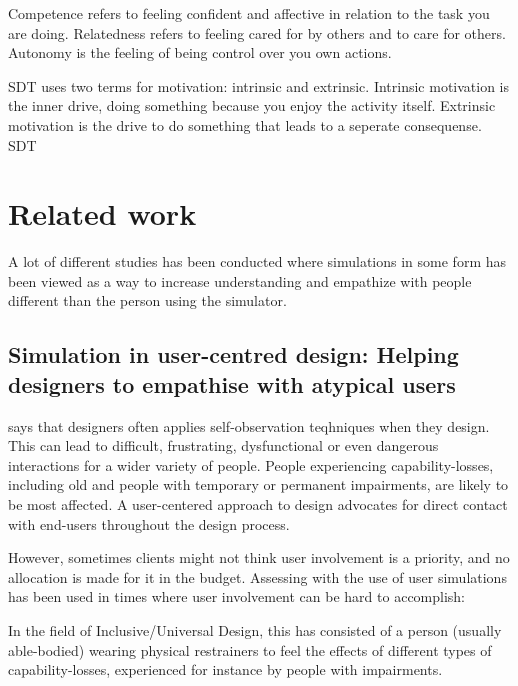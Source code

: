 Competence refers to feeling confident and affective in relation to the task you are doing. Relatedness refers to feeling cared for by others and to care for others. Autonomy is the feeling of being control over you own actions.

SDT uses two terms for motivation: intrinsic and extrinsic. Intrinsic motivation is the inner drive, doing something because you enjoy the activity itself. Extrinsic motivation is the drive to do something that leads to a seperate consequense. SDT 


\section{Related work}
A lot of different studies has been conducted where simulations in some form has been viewed as a way to increase understanding and empathize with people different than the person using the simulator. 

\subsection{Simulation in user-centred design: Helping designers to empathise with atypical users}
\textcite{Cardoso2012} says that designers often applies self-observation teqhniques when they design. This can lead to difficult, frustrating, dysfunctional or even dangerous interactions for a wider variety of people. People experiencing capability-losses, including old and people with temporary or permanent impairments, are likely to be most affected. A user-centered approach to design advocates for direct contact with end-users throughout the design process. 

However, sometimes clients might not think user involvement is a priority, and no allocation is made for it in the budget. Assessing with the use of user simulations has been used in times where user involvement can be hard to accomplish: 
\begin{displayquote}
    In the field of Inclusive/Universal Design, this has consisted of a person (usually able-bodied) wearing physical restrainers to feel the effects of different types of capability-losses, experienced for instance by people with impairments.
\end{displayquote}




